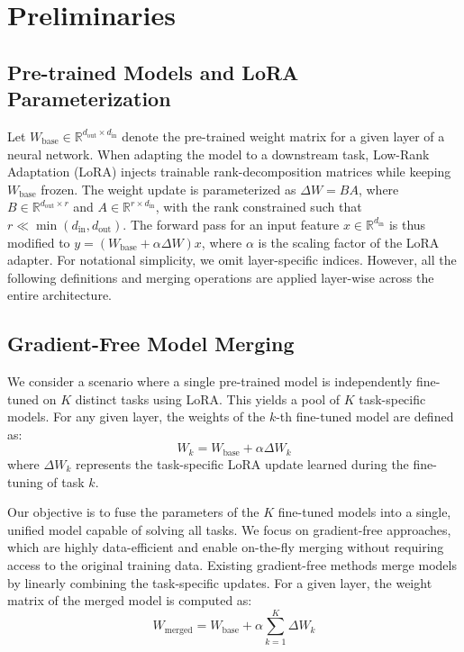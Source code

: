 \documentclass[10pt]{article} %
\begin{document}
\section{Preliminaries}

\subsection{Pre-trained Models and LoRA Parameterization} 
Let $W_{\text{base}} \in \mathbb{R}^{d_{\text{out}} \times d_{\text{in}}}$ denote the pre-trained weight matrix for a given layer of a neural network. When adapting the model to a downstream task, Low-Rank Adaptation (LoRA) injects trainable rank-decomposition matrices while keeping $W_{\text{base}}$ frozen. The weight update is parameterized as $\Delta W = B A$, where $B \in \mathbb{R}^{d_{\text{out}} \times r}$ and $A \in \mathbb{R}^{r \times d_{\text{in}}}$, with the rank constrained such that $r \ll \min(d_{\text{in}}, d_{\text{out}})$. The forward pass for an input feature $x \in \mathbb{R}^{d_{\text{in}}}$ is thus modified to $y = (W_{\text{base}} + \alpha\Delta W)x$, where $\alpha$ is the scaling factor of the LoRA adapter.  For notational simplicity, we omit layer-specific indices. However, all the following definitions and merging operations are applied layer-wise across the entire architecture.

\subsection{Gradient-Free Model Merging}
We consider a scenario where a single pre-trained model is independently fine-tuned on $K$ distinct tasks using LoRA. This yields a pool of $K$ task-specific models. For any given layer, the weights of the $k$-th fine-tuned model are defined as:$$W_k = W_{\text{base}} + \alpha \Delta W_k$$where $\Delta W_k$ represents the task-specific LoRA update learned during the fine-tuning of task $k$.

Our objective is to fuse the parameters of the $K$ fine-tuned models into a single, unified model capable of solving all tasks. We focus on gradient-free approaches, which are highly data-efficient and enable on-the-fly merging without requiring access to the original training data. Existing gradient-free methods merge models by linearly combining the task-specific updates. For a given layer, the weight matrix of the merged model is computed as:$$W_{\text{merged}} = W_{\text{base}} + \alpha\sum_{k=1}^K \Delta W_k$$
\end{document}
